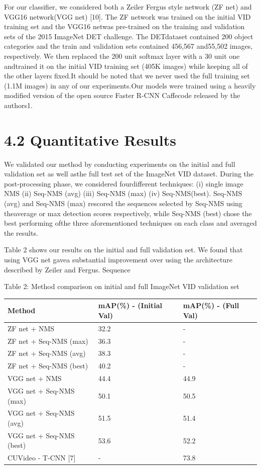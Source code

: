 \documentclass[
  10
]{article}
\newcounter{none} %
\begin{document}
For our classifier, we considered both a Zeiler Fergus style network (ZF
net) and VGG16 network(VGG net) {[}10{]}. The ZF network was trained on
the initial VID training set and the VGG16 netwas pre-trained on the
training and validation sets of the 2015 ImageNet DET challenge. The
DETdataset contained 200 object categories and the train and validation
sets contained 456,567 and55,502 images, respectively. We then replaced
the 200 unit softmax layer with a 30 unit one andtrained it on the
initial VID training set (405K images) while keeping all of the other
layers fixed.It should be noted that we never used the full training set
(1.1M images) in any of our experiments.Our models were trained using a
heavily modified version of the open source Faster R-CNN Caffecode
released by the authors1.

\section{4.2 Quantitative Results}\label{quantitative-results}

We validated our method by conducting experiments on the initial and
full validation set as well asthe full test set of the ImageNet VID
dataset. During the post-processing phase, we considered fourdifferent
techniques: (i) single image NMS (ii) Seq-NMS (avg) (iii) Seq-NMS (max)
(iv) Seq-NMS(best). Seq-NMS (avg) and Seq-NMS (max) rescored the
sequences selected by Seq-NMS using theaverage or max detection scores
respectively, while Seq-NMS (best) chose the best performing ofthe three
aforementioned techniques on each class and averaged the results.

Table 2 shows our results on the initial and full validation set. We
found that using VGG net gavea substantial improvement over using the
architecture described by Zeiler and Fergus. Sequence

Table 2: Method comparison on initial and full ImageNet VID validation
set

{\def\LTcaptype{none} %
\begin{longtable}[]{@{}|l|l|l|@{}}
\toprule\noalign{}
\endhead
\bottomrule\noalign{}
\endlastfoot
\hline
Method & mAP(\%) - (Initial Val) & mAP(\%) - (Full Val) \\
\hline
ZF net + NMS & 32.2 & - \\
\hline
ZF net + Seq-NMS (max) & 36.3 & - \\
\hline
ZF net + Seq-NMS (avg) & 38.3 & - \\
\hline
ZF net + Seq-NMS (best) & 40.2 & - \\
\hline
VGG net + NMS & 44.4 & 44.9 \\
\hline
VGG net + Seq-NMS (max) & 50.1 & 50.5 \\
\hline
VGG net + Seq-NMS (avg) & 51.5 & 51.4 \\
\hline
VGG net + Seq-NMS (best) & 53.6 & 52.2 \\
\hline
CUVideo - T-CNN {[}7{]} & - & 73.8 \\
\hline
\end{longtable}
}
\end{document}
